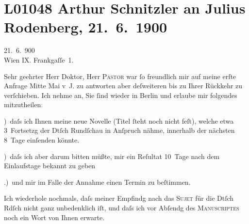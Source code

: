 

\section[Arthur Schnitzler an Julius Rodenberg, 21. 6. 1900]{L01048 Arthur Schnitzler an Julius Rodenberg, 21. 6. 1900}
\nopagebreak{}
\rehead{ }\normalsize\beginnumbering{}
\toendnotes[C]{\smallbreak\pagebreak[2]}
\toendnotes[C]{\smallbreak}
\pstart
           \raggedleft{}{\pb}21. 6. 900{\\}Wien IX. Frankgaſſe 1.\pend
           
\pstart{}Sehr geehrter Herr Doktor,\pend\vspace{0.5em}
\pstart
           Herr \textsc{Pastor} war ſo freundlich mir auf meine erſte Anfrage Mitte Mai v J. zu
               antworten aber deſweiteren bis zu Ihrer Rückkehr zu verſchieben. Ich nehme an, Sie
               ſind wieder in Berlin und erlaube mir folgendes
                  mitzutheilen\textcolor{gray}{:}\pend
           
) daſs ich Ihnen meine neue Novelle (Titel ſteht noch nicht {\pb}feſt),
               welche etwa 3 Fortsetzg der Dtſch Rundſchau in
               Anſpruch nähme, innerhalb der nächsten 8 Tage einſenden könnte.\pend
           
) daſs ich aber darum bitten müßte, mir ein Reſultat  10 Tage nach dem Einlaufstage bekannt zu geben\pend
           
.) und mir im Falle der Annahme einen Termin zu {\pb}beſtimmen.\pend
           
\pstart
           Ich wiederhole nochmals, daſs meiner Empfindg nach das \textsc{Sujet} für die Dtſch Rdſch nicht ganz
               unbedenklich iſt, und daſs ich vor Abſendg des \textsc{Manuscriptes} noch ein Wort von Ihnen erwarte.\pend
           
